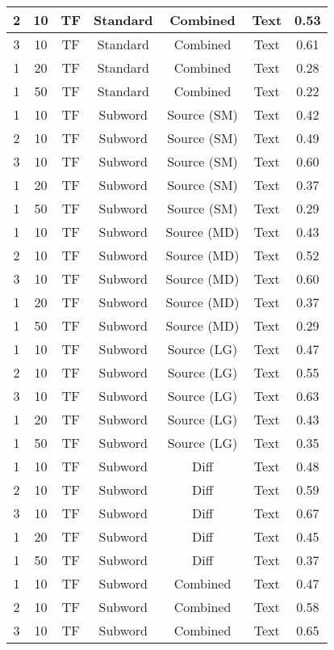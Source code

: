 \begin{longtable}{|c|c|c|c|c|c|c|}
\hline
2 & 10 & TF & Standard & Combined & Text & 0.53 \\
\hline
3 & 10 & TF & Standard & Combined & Text & 0.61 \\
\hline
1 & 20 & TF & Standard & Combined & Text & 0.28 \\
\hline
1 & 50 & TF & Standard & Combined & Text & 0.22 \\
\hline
1 & 10 & TF & Subword & Source (SM) & Text & 0.42 \\
\hline
2 & 10 & TF & Subword & Source (SM) & Text & 0.49 \\
\hline
3 & 10 & TF & Subword & Source (SM) & Text & 0.60 \\
\hline
1 & 20 & TF & Subword & Source (SM) & Text & 0.37 \\
\hline
1 & 50 & TF & Subword & Source (SM) & Text & 0.29 \\
\hline
1 & 10 & TF & Subword & Source (MD) & Text & 0.43 \\
\hline
2 & 10 & TF & Subword & Source (MD) & Text & 0.52 \\
\hline
3 & 10 & TF & Subword & Source (MD) & Text & 0.60 \\
\hline
1 & 20 & TF & Subword & Source (MD) & Text & 0.37 \\
\hline
1 & 50 & TF & Subword & Source (MD) & Text & 0.29 \\
\hline
1 & 10 & TF & Subword & Source (LG) & Text & 0.47 \\
\hline
2 & 10 & TF & Subword & Source (LG) & Text & 0.55 \\
\hline
3 & 10 & TF & Subword & Source (LG) & Text & 0.63 \\
\hline
1 & 20 & TF & Subword & Source (LG) & Text & 0.43 \\
\hline
1 & 50 & TF & Subword & Source (LG) & Text & 0.35 \\
\hline
1 & 10 & TF & Subword & Diff & Text & 0.48 \\
\hline
2 & 10 & TF & Subword & Diff & Text & 0.59 \\
\hline
3 & 10 & TF & Subword & Diff & Text & 0.67 \\
\hline
1 & 20 & TF & Subword & Diff & Text & 0.45 \\
\hline
1 & 50 & TF & Subword & Diff & Text & 0.37 \\
\hline
1 & 10 & TF & Subword & Combined & Text & 0.47 \\
\hline
2 & 10 & TF & Subword & Combined & Text & 0.58 \\
\hline
3 & 10 & TF & Subword & Combined & Text & 0.65 \\

\end{longtable}
